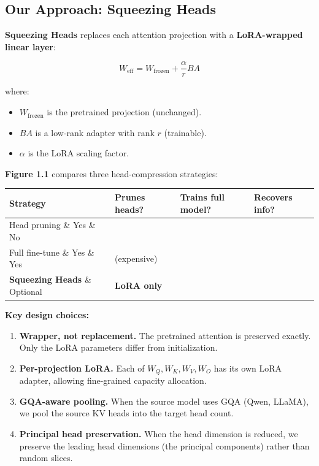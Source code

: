 \subsection{Our Approach: Squeezing Heads}

\textbf{Squeezing Heads} replaces each attention projection with a 
\textbf{LoRA-wrapped linear layer}:

\[
W_\text{eff} = W_\text{frozen} + \frac{\alpha}{r} B A
\]

where:
\begin{itemize}
\item $W_\text{frozen}$ is the pretrained projection (unchanged).
\item $B A$ is a low-rank adapter with rank $r$ (trainable).
\item $\alpha$ is the LoRA scaling factor.

\end{itemize}
\textbf{Figure 1.1} compares three head-compression strategies:

\begin{table}[H]
\centering
\small
\begin{tabular}{llll}
\toprule
\textbf{Strategy} & \textbf{Prunes heads?} & \textbf{Trains full model?} & \textbf{Recovers info?} \\
\midrule
Head pruning \& Yes \& No &  \\
Full fine-tune \& Yes \& Yes & (expensive) \\
\textbf{Squeezing Heads} \& Optional & \textbf{LoRA only} &  \\
\bottomrule
\end{tabular}
\end{table}

\textbf{Key design choices:}

\begin{enumerate}
\item \textbf{Wrapper, not replacement.} The pretrained attention is preserved
  exactly. Only the LoRA parameters differ from initialization.
\item \textbf{Per-projection LoRA.} Each of $W_Q, W_K, W_V, W_O$ has its own LoRA
  adapter, allowing fine-grained capacity allocation.
\item \textbf{GQA-aware pooling.} When the source model uses GQA (Qwen, LLaMA),
  we pool the source KV heads into the target head count.
\item \textbf{Principal head preservation.} When the head dimension is reduced, we
  preserve the leading head dimensions (the principal components) rather
  than random slices.

\end{enumerate}
